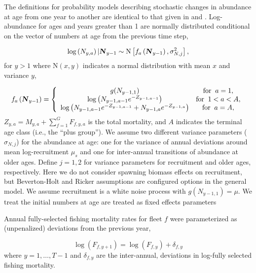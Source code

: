 \documentclass[12pt,letterpaper, leqno]{article}
\begin{document}
The definitions for probability models describing stochastic changes in abundance at age from one year to another are identical to that given in \citet{milleretal16} and \citet{millerhyun18}. Log-abundance for ages and years greater than 1 are normally distributed conditional on the vector of numbers at age from the previous
time step,

\vspace{-12pt}
\begin{equation*}
\log\left( N_{y,a}\right) | \textbf{\textsl{N}}_{y-1} \sim \text{N}\left[f_a\left(\textbf{\textsl{N}}_{y-1}\right), \sigma_{N,j}^2\right],
\end{equation*}
for $y>1$ where $\text{N}(x,y)$ indicates a normal distribution with mean $x$ and variance $y$,

\vspace{-12pt}
\begin{equation*}
 f_a\left(\textbf{\textsl{N}}_{y-1}\right) = \left\{ 
 \begin{array}{cc}
   g(N_{y-1,1}) & \text{for}\;\;a = 1,\\
   \log\left(N_{y-1,a-1}e^{-Z_{y-1,a-1}}\right) & \text{for}\;\;1<a<A,\\
   \log\left(N_{y-1,a-1}e^{-Z_{y-1,a-1}} + N_{y-1,a}e^{-Z_{y-1,a}}\right) & \text{for}\;\;a = A,
 \end{array}\right.
\end{equation*}
$Z_{y,a} = M_{y,a}+ \sum^G_{f=1} F_{f,y,a}$ is the total mortality, and $A$ indicates the terminal age class (i.e., the ``plus group''). We assume two different variance parameters ($\sigma_{N,j}$) for the abundance at age: one for the variance of annual deviations around mean log-recruitment $\mu_s$ and one for inter-annual transitions of abundance at older ages. Define $j = 1,2$ for variance parameters for recruitment and older ages, respectively. Here we do not consider spawning biomass effects on recruitment, but Beverton-Holt and Ricker assumptions are configured options in the general model. We assume recruitment is a white noise process with $g(N_{y-1,1}) = \mu$. We treat the initial numbers at age are treated as fixed effects parameters

Annual fully-selected fishing mortality rates for fleet $f$ were parameterized as (unpenalized) deviations from the previous year,

\vspace{-12pt}
\begin{equation*}
 \log\left(F_{f,y+1}\right) = \log\left(F_{f,y}\right) + \delta_{f,y}
\end{equation*}
where $y=1,\ldots,T-1$ and $\delta_{f,y}$ are the inter-annual, deviations in log-fully selected fishing mortality. 
\end{document}
